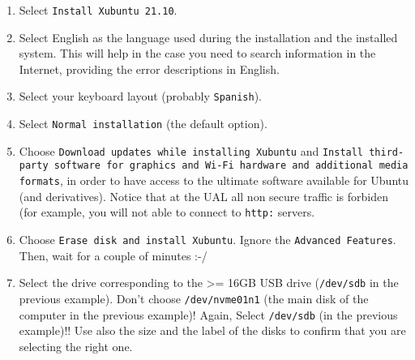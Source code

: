\begin{enumerate}
\item Select \texttt{Install Xubuntu 21.10}.
  
\item Select English as the language used during the installation and the
  installed system. This will help in the case you need to search
  information in the Internet, providing the error descriptions in
  English.
  
\item Select your keyboard layout (probably \texttt{Spanish}).

%
%

\item Select \verb|Normal installation| (the default option).
  
\item Choose \texttt{Download updates while installing Xubuntu} and
  \texttt{Install third-party software for graphics and Wi-Fi hardware
    and additional media formats}, in order to have access to the
  ultimate software available for Ubuntu (and derivatives). Notice
  that at the UAL all non secure traffic is forbiden (for example, you
  will not able to connect to \verb|http:| servers.

\item Choose \texttt{Erase disk and install Xubuntu}. Ignore the
  \verb|Advanced Features|. Then, wait for a couple of minutes :-/

\item Select the drive corresponding to the >= 16GB USB drive
  (\texttt{/dev/sdb} in the previous example). Don't choose
  \texttt{/dev/nvme01n1} (the main disk of the computer in the
  previous example)! Again, Select \texttt{/dev/sdb} (in the previous
  example)!! Use also the size and the label of the disks to confirm
  that you are selecting the right one.


\end{enumerate}
